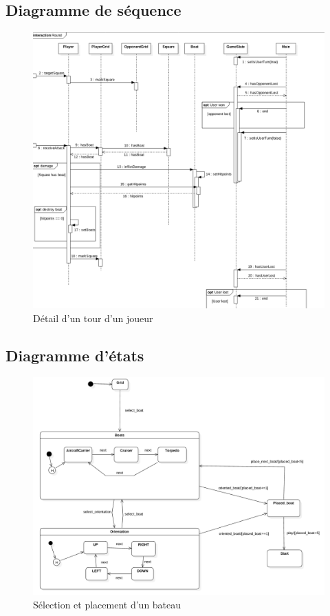 \documentclass[a4paper,10pt]{article}
\begin{document}
\subsection{Diagramme de séquence}

\begin{figure}[H]
    \center
    \includegraphics[scale=0.65]{images/sequence}
    \caption{Détail d'un tour d'un joueur}
    \label{fig:my_label}
\end{figure}

\subsection{Diagramme d'états}

\begin{figure}[H]
    \center
    \includegraphics[scale=0.45]{images/action}
    \caption{Sélection et placement d'un bateau}
    \label{fig:my_label}
\end{figure}
\end{document}
